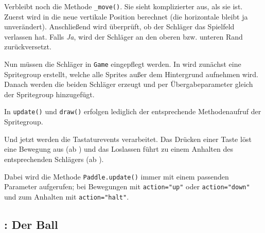 
Verbleibt noch die Methode \texttt{\_move()}. Sie sieht komplizierter aus, als sie ist. Zuerst wird in  die neue vertikale Position berechnet (die horizontale bleibt ja unverändert). Anschließend wird überprüft, ob der Schläger das Spielfeld verlassen hat. Falls \emph{Ja}, wird der Schläger an den oberen bzw. unteren Rand zurückversetzt.


Nun müssen die Schläger in \texttt{Game} eingepflegt werden. In  wird zunächst eine Spritegroup erstellt, welche alle Sprites außer dem Hintergrund aufnehmen wird. Danach werden die beiden Schläger erzeugt und per Übergabeparameter gleich der Spritegroup hinzugefügt.


In \texttt{update()} und \texttt{draw()} erfolgen lediglich der entsprechende Methodenaufruf der Spritegroup.


Und jetzt werden die Tastaturevents verarbeitet. Das Drücken einer Taste löst eine Bewegung aus (ab ) und das Loslassen führt zu einem Anhalten des entsprechenden Schlägers (ab ). 

Dabei wird die Methode \texttt{Paddle.update()} immer mit einem passenden Parameter aufgerufen; bei Bewegungen mit \verb+action="up"+ oder \verb+action="down"+ und zum Anhalten mit \verb+action="halt"+.



\subsection{: Der Ball}

